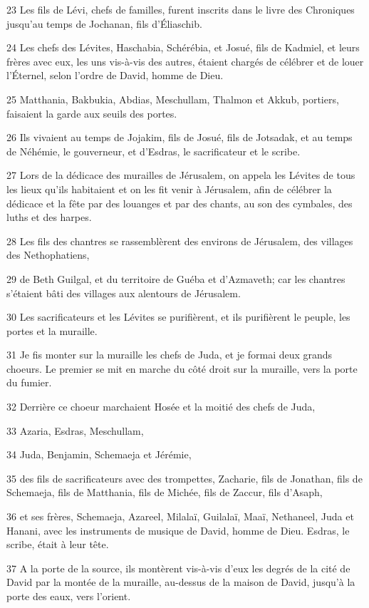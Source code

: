 \par 23 Les fils de Lévi, chefs de familles, furent inscrits dans le livre des Chroniques jusqu'au temps de Jochanan, fils d'Éliaschib.
\par 24 Les chefs des Lévites, Haschabia, Schérébia, et Josué, fils de Kadmiel, et leurs frères avec eux, les uns vis-à-vis des autres, étaient chargés de célébrer et de louer l'Éternel, selon l'ordre de David, homme de Dieu.
\par 25 Matthania, Bakbukia, Abdias, Meschullam, Thalmon et Akkub, portiers, faisaient la garde aux seuils des portes.
\par 26 Ils vivaient au temps de Jojakim, fils de Josué, fils de Jotsadak, et au temps de Néhémie, le gouverneur, et d'Esdras, le sacrificateur et le scribe.
\par 27 Lors de la dédicace des murailles de Jérusalem, on appela les Lévites de tous les lieux qu'ils habitaient et on les fit venir à Jérusalem, afin de célébrer la dédicace et la fête par des louanges et par des chants, au son des cymbales, des luths et des harpes.
\par 28 Les fils des chantres se rassemblèrent des environs de Jérusalem, des villages des Nethophatiens,
\par 29 de Beth Guilgal, et du territoire de Guéba et d'Azmaveth; car les chantres s'étaient bâti des villages aux alentours de Jérusalem.
\par 30 Les sacrificateurs et les Lévites se purifièrent, et ils purifièrent le peuple, les portes et la muraille.
\par 31 Je fis monter sur la muraille les chefs de Juda, et je formai deux grands choeurs. Le premier se mit en marche du côté droit sur la muraille, vers la porte du fumier.
\par 32 Derrière ce choeur marchaient Hosée et la moitié des chefs de Juda,
\par 33 Azaria, Esdras, Meschullam,
\par 34 Juda, Benjamin, Schemaeja et Jérémie,
\par 35 des fils de sacrificateurs avec des trompettes, Zacharie, fils de Jonathan, fils de Schemaeja, fils de Matthania, fils de Michée, fils de Zaccur, fils d'Asaph,
\par 36 et ses frères, Schemaeja, Azareel, Milalaï, Guilalaï, Maaï, Nethaneel, Juda et Hanani, avec les instruments de musique de David, homme de Dieu. Esdras, le scribe, était à leur tête.
\par 37 A la porte de la source, ils montèrent vis-à-vis d'eux les degrés de la cité de David par la montée de la muraille, au-dessus de la maison de David, jusqu'à la porte des eaux, vers l'orient.
